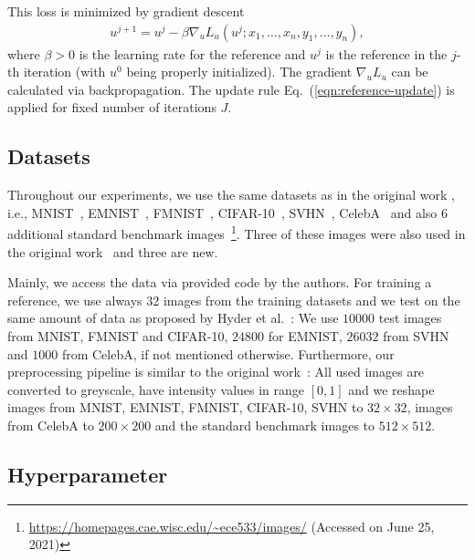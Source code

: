 This loss is minimized by gradient descent
\begin{align}
	\label{eqn:reference-update}
	u^{j + 1} = u^j - \beta \nabla_uL_u(u^j;x_1,\dots,x_n,y_1,\dots,y_n),
\end{align}
where $\beta>0$ is the learning rate for the reference and $u^j$ is
the reference in the $j$-th iteration (with $u^0$ being properly initialized). The gradient $\nabla_uL_u$ can be calculated via backpropagation.
The update rule Eq.~(\ref{eqn:reference-update}) is applied for fixed number of iterations $J$. %


\subsection{Datasets}


Throughout our experiments, we use the same datasets as in the original work \cite{hyder2020solving}, i.e., MNIST~\cite{mnist}, EMNIST~\cite{emnist}, FMNIST~\cite{fmnist}, CIFAR-10~\cite{cifar}, SVHN~\cite{svhn}, CelebA~\cite{liu2015faceattributes} and also $6$ additional standard benchmark images~\footnote{\url{https://homepages.cae.wisc.edu/~ece533/images/} (Accessed on June 25, 2021)}. Three of these images were also used in the original work~\cite{hyder2020solving} and three are new.

Mainly, we access the data via provided code by the authors. For training a reference, we use always $32$ images from the training datasets and we test on the same amount of data as proposed by Hyder et al.~\cite{hyder2020solving}: We use $10000$ test images from MNIST, FMNIST and CIFAR-10, $24800$ for EMNIST, $26032$ from SVHN and $1000$ from CelebA, if not mentioned otherwise.
Furthermore, our preprocessing pipeline is similar to the original work~\cite{hyder2020solving}:
All used images are converted to greyscale, have intensity values in range $[0, 1]$ and we reshape images from MNIST, EMNIST, FMNIST, CIFAR-10, SVHN to $32 \times 32$, images from CelebA to $200 \times 200$ and the standard benchmark images to $512 \times 512$.

\subsection{Hyperparameter}


